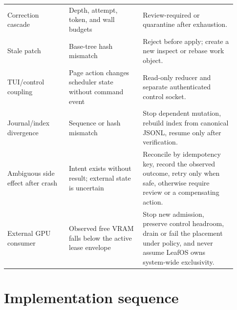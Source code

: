\documentclass[11pt,letterpaper]{article}
\begin{document}
\begin{longtable}{@{}L{0.25\linewidth}L{0.30\linewidth}L{0.38\linewidth}@{}}
Correction cascade &
Depth, attempt, token, and wall budgets &
Review-required or quarantine after exhaustion. \\
Stale patch &
Base-tree hash mismatch &
Reject before apply; create a new inspect or rebase work object. \\
TUI/control coupling &
Page action changes scheduler state without command event &
Read-only reducer and separate authenticated control socket. \\
Journal/index divergence &
Sequence or hash mismatch &
Stop dependent mutation, rebuild index from canonical JSONL, resume only after
verification. \\
Ambiguous side effect after crash &
Intent exists without result; external state is uncertain &
Reconcile by idempotency key, record the observed outcome, retry only when safe,
otherwise require review or a compensating action. \\
External GPU consumer &
Observed free VRAM falls below the active lease envelope &
Stop new admission, preserve control headroom, drain or fail the placement under
policy, and never assume LeafOS owns system-wide exclusivity. \\
\bottomrule
\end{longtable}

\section{Implementation sequence}
\end{document}
